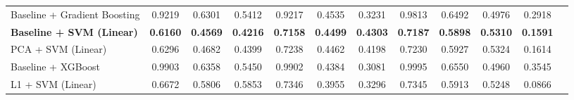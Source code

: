 \documentclass{article}
\begin{document}
{{{\begin{table}[h!]
{\begin{tabular}{l c c c c c c c c c c c}
Baseline + Gradient Boosting &
0.9219 & 0.6301 & 0.5412 &
0.9217 & 0.4535 & 0.3231 &
0.9813 & 0.6492 & 0.4976 &
0.2918 \\

\textbf{Baseline + SVM (Linear)} &
\textbf{0.6160} & \textbf{0.4569} & \textbf{0.4216} &
\textbf{0.7158} & \textbf{0.4499} & \textbf{0.4303} &
\textbf{0.7187} & \textbf{0.5898} & \textbf{0.5310} &
\textbf{0.1591} \\

PCA + SVM (Linear) &
0.6296 & 0.4682 & 0.4399 &
0.7238 & 0.4462 & 0.4198 &
0.7230 & 0.5927 & 0.5324 &
0.1614 \\

Baseline + XGBoost &
0.9903 & 0.6358 & 0.5450 &
0.9902 & 0.4384 & 0.3081 &
0.9995 & 0.6550 & 0.4960 &
0.3545 \\

L1 + SVM (Linear) &
0.6672 & 0.5806 & 0.5853 &
0.7346 & 0.3955 & 0.3296 &
0.7345 & 0.5913 & 0.5248 &
0.0866 \\

\bottomrule
\end{tabular}
}
\end{table}
\vspace{-1em}
}}}
\end{document}
